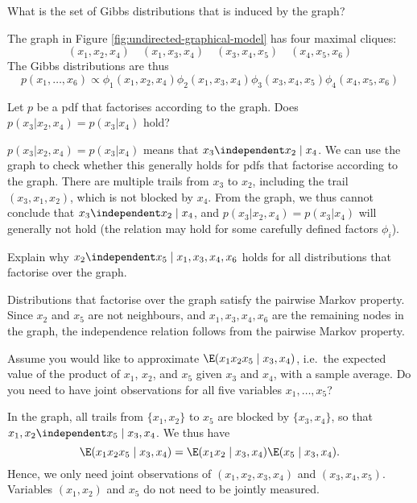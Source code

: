 \begin{exenumerate}


\item What is the set of Gibbs distributions that is induced by the graph?

  \begin{solution}
  The graph in Figure \ref{fig:undirected-graphical-model} has four maximal cliques:
  $$(x_1,x_2,x_4) \quad (x_1,x_3,x_4) \quad (x_3,x_4,x_5) \quad (x_4, x_5, x_6)$$
  The Gibbs distributions are thus
  $$p(x_1,\ldots,x_6) \propto \phi_1(x_1,x_2,x_4) \phi_2(x_1,x_3,x_4) \phi_3(x_3,x_4,x_5) \phi_4(x_4, x_5, x_6)$$
\end{solution}

\item Let $p$ be a pdf that factorises according to the graph. Does $p(x_3 | x_2, x_4) = p(x_3 | x_4)$ hold?

  \begin{solution}
    $p(x_3 | x_2, x_4) = p(x_3 | x_4)$ means that $x_3 \independent
    x_2 \mid x_4$. We can use the graph to check whether this
    generally holds for pdfs that factorise according to the
    graph. There are multiple trails from $x_3$ to $x_2$, including
    the trail $(x_3,x_1,x_2)$, which is not blocked by $x_4$. From the
    graph, we thus cannot conclude that $x_3 \independent x_2 \mid x_4$,
    and $p(x_3 | x_2, x_4) = p(x_3 | x_4)$ will generally not hold
    (the relation may hold for some carefully defined factors $\phi_i$).

  \end{solution}

\item Explain why $x_2 \independent x_5 \mid x_1,x_3,x_4,x_6$ holds for all distributions that factorise over the graph.

  \begin{solution}
    Distributions that factorise over the graph satisfy the pairwise Markov property. Since $x_2$ and $x_5$ are not neighbours, and $x_1,x_3,x_4,x_6$
    are the remaining nodes in the graph, the independence relation follows from the pairwise Markov property.
  \end{solution}

\item Assume you would like to approximate $\E (x_1 x_2 x_5 \mid
  x_3,x_4)$, i.e.\ the expected value of the product of $x_1$, $x_2$,
  and $x_5$ given $x_3$ and $x_4$, with a sample average. Do you
  need to have joint observations for all five variables $x_1, \ldots, x_5$?

  \begin{solution}

    In the graph, all trails from $\{x_1,x_2\}$ to $x_5$ are blocked by $\{x_3,x_4\}$, so that $x_1, x_2 \independent x_5 \mid x_3, x_4$. We thus have
    $$\E (x_1 x_2 x_5 \mid x_3,x_4) =  \E (x_1 x_2 \mid x_3,x_4)  \E (x_5 \mid x_3,x_4).$$
    Hence, we only need joint observations of $(x_1, x_2, x_3, x_4)$ and $(x_3, x_4,x_5)$. Variables $(x_1,x_2)$ and $x_5$ do not need to be jointly measured.

  \end{solution}

\end{exenumerate}



